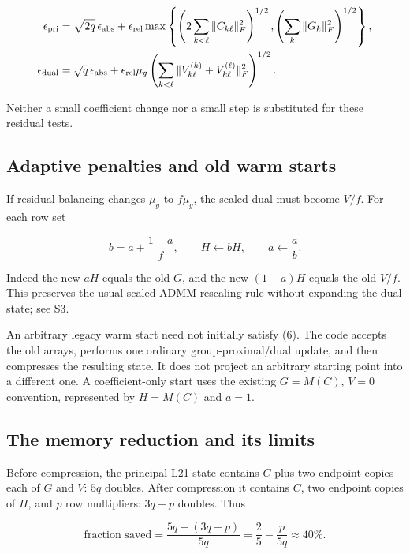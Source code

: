 \documentclass[
  11pt,
]{article}
\begin{document}
\[
\begin{aligned}
\epsilon_{\rm pri}
&=\sqrt{2q}\,\epsilon_{\rm abs}
+\epsilon_{\rm rel}\max\left\{
\left(2\sum_{k<\ell}\|C_{k\ell}\|_F^2\right)^{1/2},
\left(\sum_k\|G_k\|_F^2\right)^{1/2}\right\},\\
\epsilon_{\rm dual}
&=\sqrt q\,\epsilon_{\rm abs}
+\epsilon_{\rm rel}\mu_g
\left(\sum_{k<\ell}\|V_{k\ell}^{(k)}+V_{k\ell}^{(\ell)}\|_F^2\right)^{1/2}.
\end{aligned}
\]

Neither a small coefficient change nor a small step is substituted for
these residual tests.

\hypertarget{adaptive-penalties-and-old-warm-starts}{%
\subsection{Adaptive penalties and old warm
starts}\label{adaptive-penalties-and-old-warm-starts}}

If residual balancing changes \(\mu_g\) to \(f\mu_g\), the scaled dual
must become \(V/f\). For each row set

\[
b=a+\frac{1-a}{f},\qquad H\leftarrow bH,\qquad a\leftarrow\frac a b.
\tag{10}
\]

Indeed the new \(aH\) equals the old \(G\), and the new \((1-a)H\)
equals the old \(V/f\). This preserves the usual scaled-ADMM rescaling
rule without expanding the dual state; see S3.

An arbitrary legacy warm start need not initially satisfy (6). The code
accepts the old arrays, performs one ordinary group-proximal/dual
update, and then compresses the resulting state. It does not project an
arbitrary starting point into a different one. A coefficient-only start
uses the existing \(G=M(C)\), \(V=0\) convention, represented by
\(H=M(C)\) and \(a=1\).

\hypertarget{the-memory-reduction-and-its-limits}{%
\subsection{The memory reduction and its
limits}\label{the-memory-reduction-and-its-limits}}

Before compression, the principal L21 state contains \(C\) plus two
endpoint copies each of \(G\) and \(V\): \(5q\) doubles. After
compression it contains \(C\), two endpoint copies of \(H\), and \(p\)
row multipliers: \(3q+p\) doubles. Thus

\[
\text{fraction saved}=\frac{5q-(3q+p)}{5q}
=\frac25-\frac{p}{5q}\approx40\%.
\]
\end{document}
